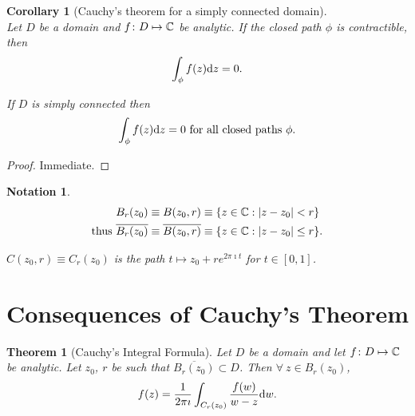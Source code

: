 \documentclass{notes}
\theoremstyle{plain}
\newtheorem{theorem}[proposition]{Theorem}
\newtheorem{corollary}[proposition]{Corollary}
\newtheorem*{notation}{Notation}
\begin{document}
\begin{corollary}[Cauchy's theorem for a simply connected domain]%
\hfill\\
Let $D$ be a domain and $f \colon D \mapsto \mathbb{C}$ be analytic.  If the closed
path $\phi$ is contractible, then
\[
\int_\phi f(z) \mathrm{d} z = 0.
\]

If $D$ is simply connected then
\[
\int_\phi f(z) \mathrm{d} z = 0 \text{ for all closed paths $\phi$.}
\]
\end{corollary}

\begin{proof}
Immediate.
\end{proof}

\begin{notation}
\begin{align*}
B_r(z_0) \equiv B(z_0,r) & \equiv \{ z \in \mathbb{C} : \left|z-z_0\right| < r \} \\
\text{thus } \overline{B_r(z_0)} \equiv \overline{B(z_0,r)} & \equiv
\{ z \in \mathbb{C} : \left|z-z_0\right| \le r \}.
\end{align*}

$C(z_0,r) \equiv C_r(z_0)$ is the path $t \mapsto z_0 + r e^{2 \pi \imath t}$
for $t \in [0,1]$.
\end{notation}

\section{Consequences of Cauchy's Theorem}

\begin{theorem}[Cauchy's Integral Formula]%
   Let $D$ be a domain and let $f
  \colon D \mapsto \mathbb{C}$ be analytic.  Let $z_0$, $r$ be such that
  $\overline{B_r(z_0)} \subset D$.  Then $\forall\ z \in B_r(z_0)$,
\[
f(z) = \frac{1}{2 \pi \imath} \int_{C_r(z_0)} \frac{f(w)}{w-z} \mathrm{d} w.
\]
\end{theorem}
\end{document}

